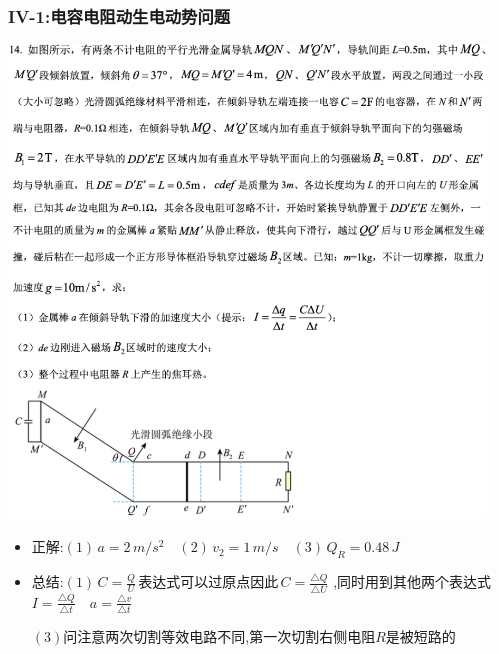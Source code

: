 \documentclass{article}
\begin{document}
\subsubsection{IV-1:电容电阻动生电动势问题}
\includegraphics[width=0.95\textwidth,keepaspectratio]{./pictures/3.10-2.png}

\begin{itemize}
    \item 正解:\quad $(1) \, a = 2 \, m/s^{2} \quad (2) \, v_{2} = 1 \, m/s \quad (3) \, Q_{R} = 0.48 \, J$
    \item 总结:\quad $(1) \, C = \frac{Q}{U} \, \text{表达式可以过原点因此} \, C = \frac{\triangle Q}{\triangle U}$
          ,同时用到其他两个表达式$I = \frac{\triangle Q}{\triangle t} \quad a = \frac{\triangle v}{\triangle t}$

          \hspace{3.2em}$(3)$问注意两次切割等效电路不同,第一次切割右侧电阻$R$是被短路的
\end{itemize}

\vspace{2em}
\end{document}
